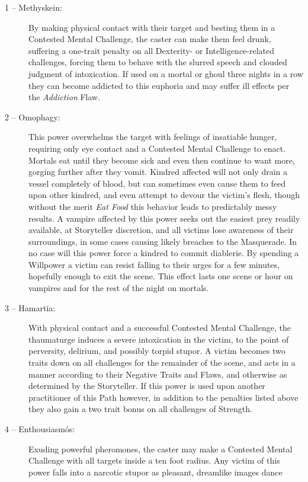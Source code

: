 \begin{description}
	\item[1 -- Methyskein:]  By making physical contact with their target and besting them in a Contested Mental Challenge, 
	the caster can make them feel drunk, suffering a one-trait penalty on all Dexterity- or Intelligence-related challenges, 
	forcing them to behave with the slurred speech and clouded judgment of intoxication.  If used on a mortal or ghoul three 
	nights in a row they can become addicted to this euphoria and may suffer ill effects per the \emph{Addiction} Flaw.
	\item[2 -- Omophagy:]  This power overwhelms the target with feelings of insatiable hunger, requiring only eye contact 
	and a Contested Mental Challenge to enact.  Mortals eat until they become sick and even then continue to want more, gorging 
	further after they vomit.  Kindred affected will not only drain a vessel completely of blood, but can sometimes even cause 
	them to feed upon other kindred, and even attempt to devour the victim's flesh, though without the merit \emph{Eat Food} this 
	behavior leads to predictably messy results.  A vampire affected by this power seeks out the easiest prey readily available, 
	at Storyteller discretion, and all victims lose awareness of their surroundings, in some cases causing likely breaches to the 
	Masquerade.  In no case will this power force a kindred to commit diablerie.  By spending a Willpower a victim can resist 
	falling to their urges for a few minutes, hopefully enough to exit the scene.  This effect lasts one scene or hour on vampires 
	and for the rest of the night on mortals.
	\item[3 -- Hamartia:]  With physical contact and a successful Contested Mental Challenge, the thaumaturge induces a severe 
	intoxication in the victim, to the point of perversity, delirium, and possibly torpid stupor.  A victim becomes two traits down 
	on all challenges for the remainder of the scene, and acts in a manner according to their Negative Traits and Flaws, and otherwise 
	as determined by the Storyteller.  If this power is used upon another practitioner of this Path however, in addition to the 
	penalties listed above they also gain a two trait bonus on all challenges of Strength.
	\item[4 -- Enthousiasm\'{o}s:]  Exuding powerful pheromones, the caster may make a Contested Mental Challenge with all 
	targets inside a ten foot radius.  Any victim of this power falls into a narcotic stupor as pleasant, dreamlike images dance 

\end{description}
